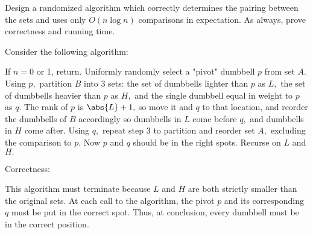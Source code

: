 \documentclass{article}
\begin{document}
Design a randomized algorithm which correctly determines the pairing between the sets and uses only $O(n \log n)$ comparisons in expectation.  As always, prove correctness and running time.
\begin{soln}
	Consider the following algorithm:
	\begin{enumerate}
		\ii If $n=0$ or 1, return.
		\ii Uniformly randomly select a "pivot" dumbbell $p$ from set $A.$
		\ii Using $p,$ partition $B$ into 3 sets: the set of dumbbells lighter than $p$ as $L,$ the set of dumbbells heavier than $p$ as $H,$ and the single dumbbell equal in weight to $p$ as $q.$ The rank of $p$ is $\abs{L}+1,$ so move it and $q$ to that location, and reorder the dumbbells of $B$ accordingly so dumbbells in $L$ come before $q,$ and dumbbells in $H$ come after.
		\ii Using $q,$ repeat step 3 to partition and reorder set $A,$ excluding the comparison to $p.$ Now $p$ and $q$ should be in the right spots.
		\ii Recurse on $L$ and $H.$
	\end{enumerate}

	\newpage
	Correctness:
	\begin{subproof}
		This algorithm must terminate because $L$ and $H$ are both strictly smaller than the original sets. At each call to the algorithm, the pivot $p$ and its corresponding $q$ must be put in the correct spot. Thus, at conclusion, every dumbbell must be in the correct position.	
	\end{subproof}


\end{soln}
\end{document}
